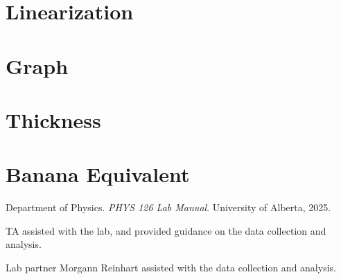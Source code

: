 \documentclass[12pt]{article}
\begin{document}
\section{Linearization}

\section{Graph}

\section{Thickness}

\section{Banana Equivalent}

\begin{thebibliography}{9}
    Department of Physics. \textit{PHYS 126 Lab Manual}. University of Alberta, 2025.

    TA assisted with the lab, and provided guidance on the data collection and analysis.

    Lab partner Morgann Reinhart assisted with the data collection and analysis.
    
\end{thebibliography}
\end{document}
